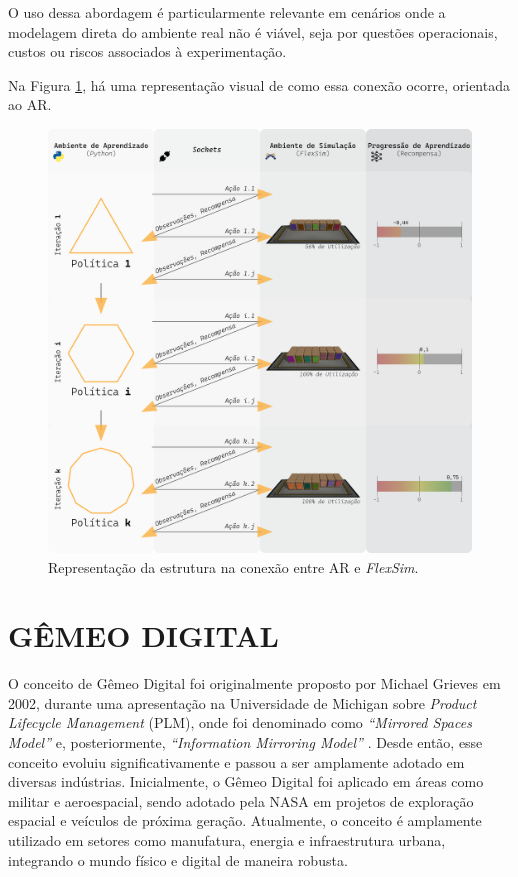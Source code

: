 \documentclass[
    12pt,                %
    openright,           %
    oneside,             %
    a4paper,             %
    english,             %
    spanish,             %
    brazil               %
]{ufscar}
\begin{document}
O uso dessa abordagem é particularmente relevante em cenários onde a modelagem direta do ambiente real não é viável, seja por questões operacionais, custos ou riscos associados à experimentação.

Na Figura \ref{figure:sockets}, há uma representação visual de como essa conexão ocorre, orientada ao AR.

\begin{figure}[hbt]
\centering
  \caption{Representação da estrutura na conexão entre AR e \textit{FlexSim}.}    \label{figure:sockets}
  \includegraphics[width=1\textwidth]{figures/Imagem Python Sockets FlexSim RL.png} %
\end{figure}


\section{GÊMEO DIGITAL}

O conceito de Gêmeo Digital foi originalmente proposto por Michael Grieves em 2002, durante uma apresentação na Universidade de Michigan sobre \textit{Product Lifecycle Management} (PLM), onde foi denominado como \textit{``Mirrored Spaces Model''} e, posteriormente, \textit{``Information Mirroring Model''} \cite{grieves_digital_2016}. Desde então, esse conceito evoluiu significativamente e passou a ser amplamente adotado em diversas indústrias. Inicialmente, o Gêmeo Digital foi aplicado em áreas como militar e aeroespacial, sendo adotado pela NASA em projetos de exploração espacial e veículos de próxima geração. Atualmente, o conceito é amplamente utilizado em setores como manufatura, energia e infraestrutura urbana, integrando o mundo físico e digital de maneira robusta.
\end{document}
